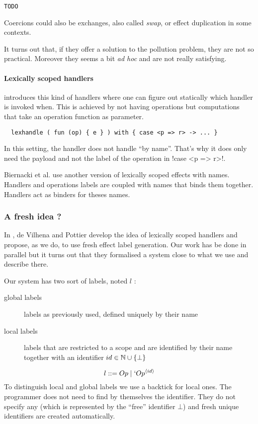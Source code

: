 \documentclass[11pt, nonacm=true, language=french, language=english]{acmart}
\begin{document}
\begin{lstlisting}[caption=Mask coercion example]
  TODO
\end{lstlisting}

Coercions could also be exchanges, also called \emph{swap}, or effect duplication in some contexts.

It turns out that, if they offer a solution to the pollution problem, they are not so practical. Moreover they seems a bit \emph{ad hoc} and are not really satisfying.

\paragraph{Lexically scoped handlers}
\cite{lex-eff} introduces this kind of handlers where one can figure out statically which handler is invoked when. This is achieved by not having operations but computations that take an operation function as parameter.
\begin{lstlisting}
  lexhandle ( fun (op) { e } ) with { case <p => r> -> ... }
\end{lstlisting}
\begin{rem}
  In this setting, the handler does not handle ``by name''. That's why it does only need the payload and not the label of the operation in !case <p => r>!.
\end{rem}

Biernacki et al. \cite{binders-labels} use another version of lexically scoped effects with names. Handlers and operations labels are coupled with names that binds them together. Handlers act as binders for theses names.

\subsubsection{A fresh idea ?}
\label{sec:fresh-idea}

In \cite{tes}, de Vilhena and Pottier develop the idea of lexically scoped handlers and propose, as we do, to use fresh effect label generation. Our work has be done in parallel but it turns out that they formalised a system close to what we use and describe there.

Our system has two sort of labels, noted $l$ :
\begin{description}
  \item[global labels] labels as previously used, defined uniquely by their name
  \item[local labels] labels that are restricted to a scope and are identified by their name together with an identifier $id \in \mathbb N \cup \{\bot\}$
\end{description}
$$ l ::= Op \mid `Op^{\langle id\rangle} $$
To distinguish local and global labels we use a backtick for local ones. The programmer does not need to find by themselves the identifier. They do not specify any (which is represented by the ``free'' identifier $\bot$) and fresh unique identifiers are created automatically.
\end{document}
